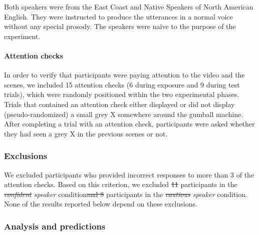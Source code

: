 \documentclass[man, floatsintext]{apa6}
\providecommand{\DIFadd}[1]{{\protect\color{blue}\uwave{#1}}} %
\providecommand{\DIFdel}[1]{{\protect\color{red}\sout{#1}}}                      %
\providecommand{\DIFaddbegin}{} %
\providecommand{\DIFaddend}{} %
\providecommand{\DIFdelbegin}{} %
\providecommand{\DIFdelend}{} %
\newcommand{\DIFscaledelfig}{0.5}
\newlength{\DIFdelgraphicswidth} %
\newlength{\DIFdelgraphicsheight} %
\newcommand{\DIFaddincludegraphics}[2][]{{\color{blue}\fbox{\DIFOincludegraphics[#1]{#2}}}} %
\newcommand{\DIFdelincludegraphics}[2][]{%
\sbox{\DIFdelgraphicsbox}{\DIFOincludegraphics[#1]{#2}}%
\settoboxwidth{\DIFdelgraphicswidth}{\DIFdelgraphicsbox} %
\settoboxtotalheight{\DIFdelgraphicsheight}{\DIFdelgraphicsbox} %
\scalebox{\DIFscaledelfig}{%
\parbox[b]{\DIFdelgraphicswidth}{\usebox{\DIFdelgraphicsbox}\\[-\baselineskip] \rule{\DIFdelgraphicswidth}{0em}}\llap{\resizebox{\DIFdelgraphicswidth}{\DIFdelgraphicsheight}{%
\setlength{\unitlength}{\DIFdelgraphicswidth}%
\begin{picture}(1,1)%
\thicklines\linethickness{2pt} %
{\color[rgb]{1,0,0}\put(0,0){\framebox(1,1){}}}%
{\color[rgb]{1,0,0}\put(0,0){\line( 1,1){1}}}%
{\color[rgb]{1,0,0}\put(0,1){\line(1,-1){1}}}%
\end{picture}%
}\hspace*{3pt}}} %
} %
\DeclareRobustCommand{\DIFaddbegin}{\DIFOaddbegin \let\includegraphics\DIFaddincludegraphics} %
\DeclareRobustCommand{\DIFaddend}{\DIFOaddend \let\includegraphics\DIFOincludegraphics} %
\DeclareRobustCommand{\DIFdelbegin}{\DIFOdelbegin \let\includegraphics\DIFdelincludegraphics} %
\DeclareRobustCommand{\DIFdelend}{\DIFOaddend \let\includegraphics\DIFOincludegraphics} %
\begin{document}
Both speakers were from the East Coast and Native Speakers of North American English.
They were instructed to produce the utterances in a normal voice without any special prosody. The speakers were
na\"ive to the purpose of the experiment.


\paragraph{Attention checks}  In order to verify that participants were paying attention to the video and the scenes, we included 15 attention checks (6 during exposure and 9 during test trials), which were randomly positioned within the two experimental phases. Trials that contained an attention check either displayed or did not display (pseudo-randomized) a small grey X somewhere around the gumball machine. After completing a trial with an attention check, participants were asked whether they had seen a grey X in the previous scenes or not.

\subsubsection{Exclusions} We excluded participants who provided incorrect responses to more than 3 of the attention checks. Based on this criterion, we excluded \DIFdelbegin \DIFdel{11 }\DIFdelend \DIFaddbegin \DIFadd{8 }\DIFaddend participants in the \textit{\DIFdelbegin \DIFdel{confident }\DIFdelend \DIFaddbegin \DIFadd{cautious }\DIFaddend speaker} condition\DIFdelbegin \DIFdel{and 8 }\DIFdelend \DIFaddbegin \DIFadd{, and 7 }\DIFaddend participants in the \textit{\DIFdelbegin \DIFdel{cautious }\DIFdelend \DIFaddbegin \DIFadd{confident }\DIFaddend speaker} condition. None of the results reported below depend on these exclusions.


\subsubsection{Analysis and predictions}  
\end{document}
